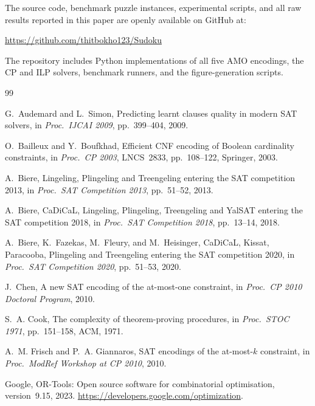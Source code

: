 \documentclass[preprint,10pt,authoryear]{elsarticle}
\begin{document}
The source code, benchmark puzzle instances, experimental scripts, and
all raw results reported in this paper are openly available on GitHub at:
\begin{center}
  \url{https://github.com/thitbokho123/Sudoku}
\end{center}
The repository includes Python implementations of all five AMO encodings,
the CP and ILP solvers, benchmark runners, and the figure-generation scripts.


\begin{thebibliography}{99}

G.~Audemard and L.~Simon,
Predicting learnt clauses quality in modern {SAT} solvers,
in \textit{Proc.\ IJCAI 2009}, pp.~399--404, 2009.

O.~Bailleux and Y.~Boufkhad,
Efficient {CNF} encoding of Boolean cardinality constraints,
in \textit{Proc.\ CP 2003}, LNCS~2833, pp.~108--122, Springer, 2003.

A.~Biere,
Lingeling, Plingeling and Treengeling entering the {SAT} competition 2013,
in \textit{Proc.\ SAT Competition 2013}, pp.~51--52, 2013.

A.~Biere,
{CaDiCaL}, Lingeling, Plingeling, Treengeling and {YalSAT} entering the
{SAT} competition 2018,
in \textit{Proc.\ SAT Competition 2018}, pp.~13--14, 2018.

A.~Biere, K.~Fazekas, M.~Fleury, and M.~Heisinger,
{CaDiCaL}, {Kissat}, Paracooba, Plingeling and Treengeling entering the
{SAT} competition 2020,
in \textit{Proc.\ SAT Competition 2020}, pp.~51--53, 2020.

J.~Chen,
A new {SAT} encoding of the at-most-one constraint,
in \textit{Proc.\ CP 2010 Doctoral Program}, 2010.

S.~A. Cook,
The complexity of theorem-proving procedures,
in \textit{Proc.\ STOC 1971}, pp.~151--158, ACM, 1971.

A.~M. Frisch and P.~A. Giannaros,
{SAT} encodings of the at-most-$k$ constraint,
in \textit{Proc.\ ModRef Workshop at CP 2010}, 2010.

Google,
{OR-Tools}: Open source software for combinatorial optimisation,
version~9.15, 2023.
\url{https://developers.google.com/optimization}.


\end{thebibliography}
\end{document}
